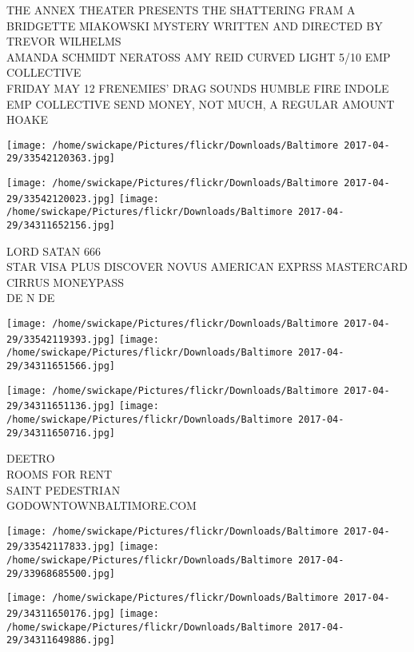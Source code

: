 \documentclass[10pt,letterpaper]{article}
\begin{document}
THE ANNEX THEATER PRESENTS THE SHATTERING FRAM A BRIDGETTE MIAKOWSKI MYSTERY WRITTEN AND DIRECTED BY TREVOR WILHELMS\\
AMANDA SCHMIDT NERATOSS AMY REID CURVED LIGHT 5/10 EMP COLLECTIVE\\
FRIDAY MAY 12 FRENEMIES' DRAG SOUNDS HUMBLE FIRE INDOLE EMP COLLECTIVE SEND MONEY, NOT MUCH, A REGULAR AMOUNT\\
HOAKE\\
\pagebreak

\texttt{[image: /home/swickape/Pictures/flickr/Downloads/Baltimore 2017-04-29/33542120363.jpg]}

\vspace{0.25in}
\texttt{[image: /home/swickape/Pictures/flickr/Downloads/Baltimore 2017-04-29/33542120023.jpg]}
\texttt{[image: /home/swickape/Pictures/flickr/Downloads/Baltimore 2017-04-29/34311652156.jpg]}

LORD SATAN 666\\
STAR VISA PLUS DISCOVER NOVUS AMERICAN EXPRSS MASTERCARD CIRRUS MONEYPASS\\
DE N DE\\
\pagebreak

\texttt{[image: /home/swickape/Pictures/flickr/Downloads/Baltimore 2017-04-29/33542119393.jpg]}
\texttt{[image: /home/swickape/Pictures/flickr/Downloads/Baltimore 2017-04-29/34311651566.jpg]}

\texttt{[image: /home/swickape/Pictures/flickr/Downloads/Baltimore 2017-04-29/34311651136.jpg]}
\texttt{[image: /home/swickape/Pictures/flickr/Downloads/Baltimore 2017-04-29/34311650716.jpg]}

DEETRO\\
ROOMS FOR RENT\\
SAINT PEDESTRIAN\\
GODOWNTOWNBALTIMORE.COM\\
\pagebreak

\texttt{[image: /home/swickape/Pictures/flickr/Downloads/Baltimore 2017-04-29/33542117833.jpg]}
\texttt{[image: /home/swickape/Pictures/flickr/Downloads/Baltimore 2017-04-29/33968685500.jpg]}

\texttt{[image: /home/swickape/Pictures/flickr/Downloads/Baltimore 2017-04-29/34311650176.jpg]}
\texttt{[image: /home/swickape/Pictures/flickr/Downloads/Baltimore 2017-04-29/34311649886.jpg]}
\end{document}
